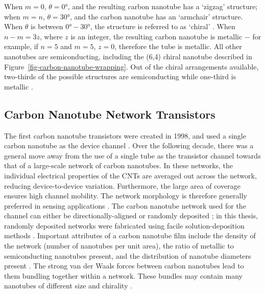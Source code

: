 \documentclass[
  a4paper,
]{scrbook}
\begin{document}
When \(m=0\), \(\theta = 0°\), and the resulting carbon nanotube has a
`zigzag' structure; when \(m=n\), \(\theta = 30°\), and the carbon
nanotube has an `armchair' structure. When \(\theta\) is between
\(0°-30°\), the structure is referred to as `chiral'
\autocite{Dekker1999,Lu2012}. When \(n-m=3z\), where \(z\) is an
integer, the resulting carbon nanotube is metallic \(-\) for example, if
\(n=5\) and \(m=5\), \(z=0\), therefore the tube is metallic. All other
nanotubes are semiconducting, including the (6,4) chiral nanotube
described in Figure~\ref{fig-carbon-nanotube-wrapping}. Out of the
chiral arrangements available, two-thirds of the possible structures are
semiconducting while one-third is metallic \autocite{Dekker1999}.

\hypertarget{sec-cnt-network-details}{%
\subsection{Carbon Nanotube Network
Transistors}\label{sec-cnt-network-details}}

The first carbon nanotube transistors were created in 1998, and used a
single carbon nanotube as the device channel
\autocite{Martel1998,Tans1998,Kauffman2008}. Over the following decade,
there was a general move away from the use of a single tube as the
transistor channel towards that of a large-scale network of carbon
nanotubes. In these networks, the individual electrical properties of
the CNTs are averaged out across the network, reducing device-to-device
variation. Furthermore, the large area of coverage ensures high channel
mobility. The network morphology is therefore generally preferred in
sensing applications \autocite{Hu2004,Cao2009,Murugathas2019,Li2023}.
The carbon nanotube network used for the channel can either be
directionally-aligned or randomly deposited
\autocite{Cao2009,Shkodra2021}; in this thesis, randomly deposited
networks were fabricated using facile solution-deposition methods
\autocite{Zheng2017,Cassie2023}. Important attributes of a carbon
nanotube film include the density of the network (number of nanotubes
per unit area), the ratio of metallic to semiconducting nanotubes
present, and the distribution of nanotube diameters present
\autocite{Cao2009,Shkodra2021}. The strong van der Waals forces between
carbon nanotubes lead to them bundling together within a network. These
bundles may contain many nanotubes of different size and chirality
\autocite{Fuhrer2000,Hu2004,Cao2009,Murugathas2019}.
\end{document}
